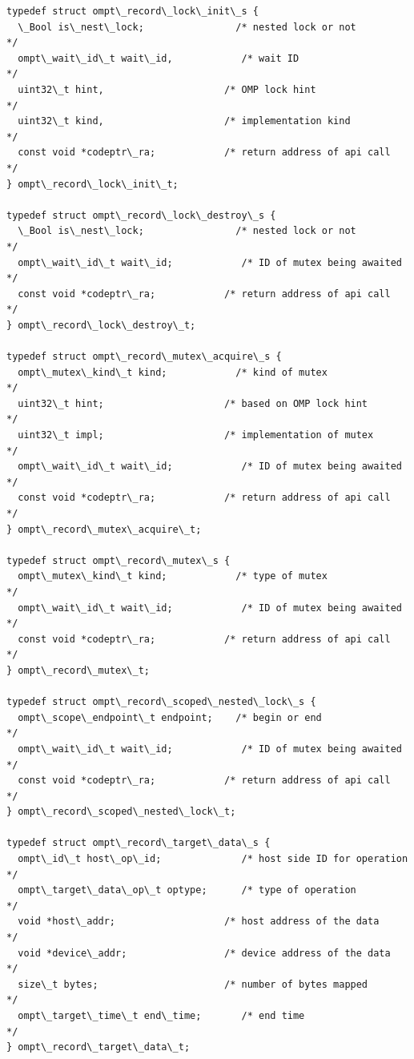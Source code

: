 \documentclass{article}
\begin{document}
\begin{boxedcode}
\begin{verbatim}
typedef struct ompt\_record\_lock\_init\_s {
  \_Bool is\_nest\_lock;                /* nested lock or not          */
  ompt\_wait\_id\_t wait\_id,            /* wait ID                     */
  uint32\_t hint,                     /* OMP lock hint               */
  uint32\_t kind,                     /* implementation kind         */
  const void *codeptr\_ra;            /* return address of api call  */          
} ompt\_record\_lock\_init\_t;

typedef struct ompt\_record\_lock\_destroy\_s {
  \_Bool is\_nest\_lock;                /* nested lock or not          */
  ompt\_wait\_id\_t wait\_id;            /* ID of mutex being awaited   */
  const void *codeptr\_ra;            /* return address of api call  */       
} ompt\_record\_lock\_destroy\_t;

typedef struct ompt\_record\_mutex\_acquire\_s {
  ompt\_mutex\_kind\_t kind;            /* kind of mutex               */
  uint32\_t hint;                     /* based on OMP lock hint      */
  uint32\_t impl;                     /* implementation of mutex     */
  ompt\_wait\_id\_t wait\_id;            /* ID of mutex being awaited   */
  const void *codeptr\_ra;            /* return address of api call  */          
} ompt\_record\_mutex\_acquire\_t;

typedef struct ompt\_record\_mutex\_s {
  ompt\_mutex\_kind\_t kind;            /* type of mutex               */
  ompt\_wait\_id\_t wait\_id;            /* ID of mutex being awaited   */
  const void *codeptr\_ra;            /* return address of api call  */       
} ompt\_record\_mutex\_t;

typedef struct ompt\_record\_scoped\_nested\_lock\_s {
  ompt\_scope\_endpoint\_t endpoint;    /* begin or end                */
  ompt\_wait\_id\_t wait\_id;            /* ID of mutex being awaited   */
  const void *codeptr\_ra;            /* return address of api call  */       
} ompt\_record\_scoped\_nested\_lock\_t;

typedef struct ompt\_record\_target\_data\_s {
  ompt\_id\_t host\_op\_id;              /* host side ID for operation  */
  ompt\_target\_data\_op\_t optype;      /* type of operation           */
  void *host\_addr;                   /* host address of the data    */
  void *device\_addr;                 /* device address of the data  */ 
  size\_t bytes;                      /* number of bytes mapped      */
  ompt\_target\_time\_t end\_time;       /* end time                    */
} ompt\_record\_target\_data\_t;


\end{verbatim}
\end{boxedcode}
\end{document}
